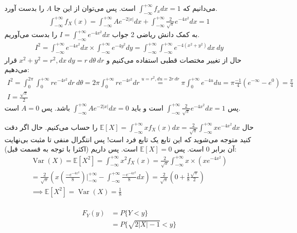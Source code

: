 \\
\\
می‌دانیم که
$\int_{-\infty}^{+\infty} f_x dx = 1$
است. پس می‌توان از این جا
$A$
را بدست آورد.
\begin{gather*}
    \int_{-\infty}^{+\infty} f_X(x) = \int_{-\infty}^{+\infty} A e^{-2|x|} dx + \int_{-\infty}^{+\infty} \frac{2}{\sqrt{\pi}} e^{-4x^2} dx = 1
\end{gather*}
به کمک دانش ریاضی 2 جواب
$I = \int_{-\infty}^{+\infty} e^{-4x^2} dx$
را بدست می‌آوریم.
\begin{gather*}
    I^2 = \int_{-\infty}^{+\infty} e^{-4x^2} dx \times \int_{-\infty}^{+\infty} e^{-4y^2} dy =
    \int_{-\infty}^{+\infty}\int_{-\infty}^{+\infty} e^{-4(x^2 + y^2)} dx ~ dy
\end{gather*}
حال از تغییر مختصات قطبی استفاده می‌کنیم و
$x^2+y^2=r^2, dx ~ dy = r ~ d \theta ~ dr $
قرار می‌دهیم:
\begin{gather*}
    I^2 = \int_{0}^{2\pi} \int_{0}^{+\infty}  r e^{-4r^2} dr ~ d \theta = 2\pi \int_{0}^{+\infty}  r e^{-4r^2} dr
    \stackrel{u=r^2, du = 2r ~ dr}{=}  \pi \int_{0}^{+\infty}  e^{-4u} du =  \pi \frac{-1}{4} (e^{-\infty} - e^0) = \frac{\pi}{4}
    \\
    I = \frac{\sqrt{\pi}}{2}
\end{gather*}
پس
$\int_{-\infty}^{+\infty} \frac{2}{\sqrt{\pi}} e^{-4x^2} dx = 1$
است و باید
$\int_{-\infty}^{+\infty} A e^{-2|x|} dx = 0$
باشد. پس
$A=0$
است.

حال
$\mathbb{E}[X] = \int_{-\infty}^{+\infty} x f_X(x) dx = \frac{2}{\sqrt{\pi}} \int_{-\infty}^{+\infty} x e^{-4x^2} dx$
را حساب می‌کنیم.
حال اگر دقت کنید متوجه می‌شوید که این تابع یک تابع فرد است! پس انتگرال منفی تا مثبت بی‌نهایت آن برابر 0 است.
پس
$\mathbb{E}[X] = 0$
است. پس داریم (اکثرا با توجه به قسمت قبل):
\begin{gather*}
    \operatorname{Var}(X) = \mathbb{E}[X^2] = \int_{-\infty}^{+\infty} x^2 f_X(x)
    = \frac{2}{\sqrt{\pi}} \int_{-\infty}^{+\infty} x \times (x e^{-4x^2})\\
    = \frac{2}{\sqrt{\pi}} (x (\frac{-e^{-4x^2}}{8}) \big |_{-\infty}^{+\infty} - \int_{-\infty}^{+\infty} \frac{-e^{-4x^2}}{8} dx)
    = \frac{2}{\sqrt{\pi}} (0 + \frac{1}{8} \frac{\sqrt{\pi}}{2})\\
    \implies \mathbb{E}[X^2] = \operatorname{Var}(X) = \frac{1}{8}
\end{gather*}
\\
\begin{align*}
    F_Y(y) &= P\{Y < y\}\\
    &= P\{\sqrt{2|X|-1} < y\}
\end{align*}

